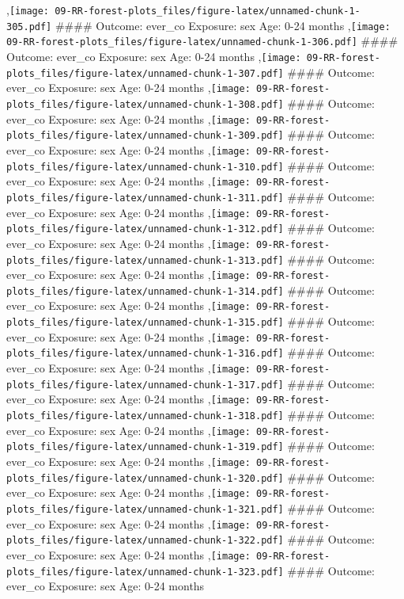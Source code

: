 \documentclass[
  9pt,
]{book}
\begin{document}
,\texttt{[image: 09-RR-forest-plots\_files/figure-latex/unnamed-chunk-1-305.pdf]}
\#\#\#\# Outcome: ever\_co Exposure: sex Age: 0-24 months
,\texttt{[image: 09-RR-forest-plots\_files/figure-latex/unnamed-chunk-1-306.pdf]}
\#\#\#\# Outcome: ever\_co Exposure: sex Age: 0-24 months
,\texttt{[image: 09-RR-forest-plots\_files/figure-latex/unnamed-chunk-1-307.pdf]}
\#\#\#\# Outcome: ever\_co Exposure: sex Age: 0-24 months
,\texttt{[image: 09-RR-forest-plots\_files/figure-latex/unnamed-chunk-1-308.pdf]}
\#\#\#\# Outcome: ever\_co Exposure: sex Age: 0-24 months
,\texttt{[image: 09-RR-forest-plots\_files/figure-latex/unnamed-chunk-1-309.pdf]}
\#\#\#\# Outcome: ever\_co Exposure: sex Age: 0-24 months
,\texttt{[image: 09-RR-forest-plots\_files/figure-latex/unnamed-chunk-1-310.pdf]}
\#\#\#\# Outcome: ever\_co Exposure: sex Age: 0-24 months
,\texttt{[image: 09-RR-forest-plots\_files/figure-latex/unnamed-chunk-1-311.pdf]}
\#\#\#\# Outcome: ever\_co Exposure: sex Age: 0-24 months
,\texttt{[image: 09-RR-forest-plots\_files/figure-latex/unnamed-chunk-1-312.pdf]}
\#\#\#\# Outcome: ever\_co Exposure: sex Age: 0-24 months
,\texttt{[image: 09-RR-forest-plots\_files/figure-latex/unnamed-chunk-1-313.pdf]}
\#\#\#\# Outcome: ever\_co Exposure: sex Age: 0-24 months
,\texttt{[image: 09-RR-forest-plots\_files/figure-latex/unnamed-chunk-1-314.pdf]}
\#\#\#\# Outcome: ever\_co Exposure: sex Age: 0-24 months
,\texttt{[image: 09-RR-forest-plots\_files/figure-latex/unnamed-chunk-1-315.pdf]}
\#\#\#\# Outcome: ever\_co Exposure: sex Age: 0-24 months
,\texttt{[image: 09-RR-forest-plots\_files/figure-latex/unnamed-chunk-1-316.pdf]}
\#\#\#\# Outcome: ever\_co Exposure: sex Age: 0-24 months
,\texttt{[image: 09-RR-forest-plots\_files/figure-latex/unnamed-chunk-1-317.pdf]}
\#\#\#\# Outcome: ever\_co Exposure: sex Age: 0-24 months
,\texttt{[image: 09-RR-forest-plots\_files/figure-latex/unnamed-chunk-1-318.pdf]}
\#\#\#\# Outcome: ever\_co Exposure: sex Age: 0-24 months
,\texttt{[image: 09-RR-forest-plots\_files/figure-latex/unnamed-chunk-1-319.pdf]}
\#\#\#\# Outcome: ever\_co Exposure: sex Age: 0-24 months
,\texttt{[image: 09-RR-forest-plots\_files/figure-latex/unnamed-chunk-1-320.pdf]}
\#\#\#\# Outcome: ever\_co Exposure: sex Age: 0-24 months
,\texttt{[image: 09-RR-forest-plots\_files/figure-latex/unnamed-chunk-1-321.pdf]}
\#\#\#\# Outcome: ever\_co Exposure: sex Age: 0-24 months
,\texttt{[image: 09-RR-forest-plots\_files/figure-latex/unnamed-chunk-1-322.pdf]}
\#\#\#\# Outcome: ever\_co Exposure: sex Age: 0-24 months
,\texttt{[image: 09-RR-forest-plots\_files/figure-latex/unnamed-chunk-1-323.pdf]}
\#\#\#\# Outcome: ever\_co Exposure: sex Age: 0-24 months
\end{document}
